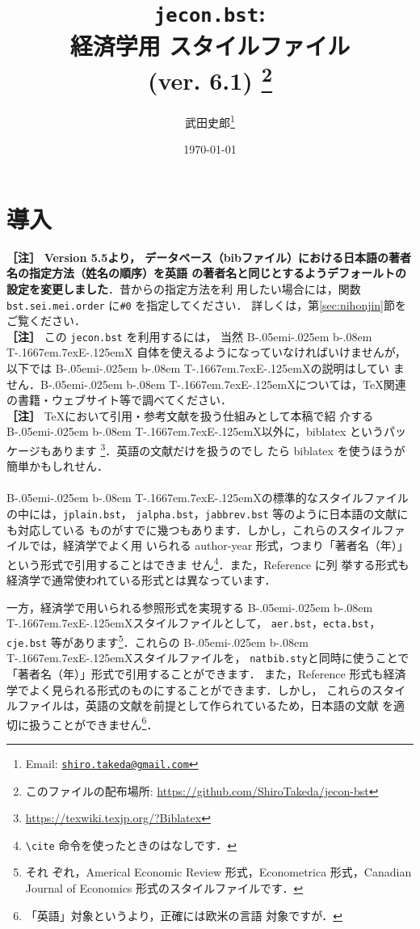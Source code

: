 \documentclass[a4j,10pt]{jarticle}
\title{\texttt{jecon.bst}:\\ 経済学用 \BibTeX{} スタイルファイル\\ (ver. 6.1)
\thanks{このファイルの配布場所: \url{https://github.com/ShiroTakeda/jecon-bst}}
}
\author{武田史郎\thanks{Email: \texttt{\href{mailto:shiro.takeda@gmail.com}{shiro.takeda@gmail.com}}}}
\date{\today}
\def\BibTeX{{\rm B\kern-.05em{\sc i\kern-.025em b}\kern-.08em
    T\kern-.1667em\lower.7ex\hbox{E}\kern-.125emX}}
\begin{document}
\maketitle

\tableofcontents


\section{導入}

\noindent \textbf{［注］} \textcolor[named]{BrickRed}{\textbf{Version 5.5より，
データベース（bibファイル）における日本語の著者名の指定方法（姓名の順序）を英語
の著者名と同じとするようデフォールトの設定を変更しました}}．昔からの指定方法を利
用したい場合には，関数 \texttt{bst.sei.mei.order} に\verb|#0| を指定してください．
詳しくは，第\ref{sec:nihonjin}節をご覧ください．
\\


\noindent \textbf{［注］} この \texttt{jecon.bst} を利用するには， 当然 \BibTeX
自体を使えるようになっていなければいけませんが，以下では \BibTeX の説明はしてい
ません．\BibTeX については，\TeX 関連の書籍・ウェブサイト等で調べてください．\\

\noindent \textbf{［注］} \TeX において引用・参考文献を扱う仕組みとして本稿で紹
介する \BibTeX 以外に，biblatex というパッケージもあります
\footnote{\url{https://texwiki.texjp.org/?Biblatex}}．英語の文献だけを扱うのでし
たら biblatex を使うほうが簡単かもしれせん．
\\
\\

\BibTeX の標準的なスタイルファイルの中には，\texttt{jplain.bst}，
\texttt{jalpha.bst}，\texttt{jabbrev.bst} 等のように日本語の文献にも対応している
ものがすでに幾つもあります．しかし，これらのスタイルファイルでは，経済学でよく用
いられる author-year 形式，つまり「著者名（年）」という形式で引用することはできま
せん\footnote{\verb|\cite| 命令を使ったときのはなしです．}．また，Reference に列
挙する形式も経済学で通常使われている形式とは異なっています．

一方，経済学で用いられる参照形式を実現する \BibTeX スタイルファイルとして，
\texttt{aer.bst}，\texttt{ecta.bst}，\texttt{cje.bst} 等があります\footnote{それ
ぞれ，Americal Economic Review 形式，Econometrica 形式，Canadian Journal of
Economics 形式のスタイルファイルです．}．これらの \BibTeX スタイルファイルを，
\texttt{natbib.sty}と同時に使うことで「著者名（年）」形式で引用することができます．
また，Reference 形式も経済学でよく見られる形式のものにすることができます．しかし，
これらのスタイルファイルは，英語の文献を前提として作られているため，日本語の文献
を適切に扱うことができません\footnote{「英語」対象というより，正確には欧米の言語
対象ですが．}．
\end{document}
